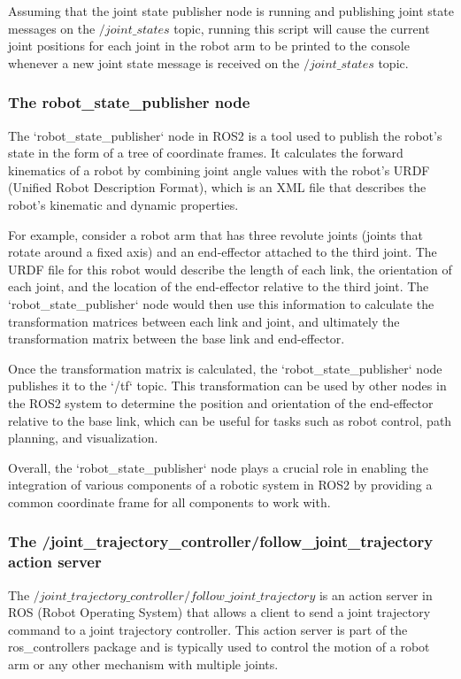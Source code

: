 \documentclass[12pt,oneside]{article}
\begin{document}
Assuming that the joint state publisher node is running and publishing joint state messages on the $/joint\_states$ topic, running this script will cause the current joint positions for each joint in the robot arm to be printed to the console whenever a new joint state message is received on the $/joint\_states$ topic.

\subsubsection{The robot\_state\_publisher node}\label{ros2-robot-state-publisher}
The `robot\_state\_publisher` node in ROS2 is a tool used to publish the robot's state in the form of a tree of coordinate frames. It calculates the forward kinematics of a robot by combining joint angle values with the robot's URDF (Unified Robot Description Format), which is an XML file that describes the robot's kinematic and dynamic properties. 

For example, consider a robot arm that has three revolute joints (joints that rotate around a fixed axis) and an end-effector attached to the third joint. The URDF file for this robot would describe the length of each link, the orientation of each joint, and the location of the end-effector relative to the third joint. The `robot\_state\_publisher` node would then use this information to calculate the transformation matrices between each link and joint, and ultimately the transformation matrix between the base link and end-effector.

Once the transformation matrix is calculated, the `robot\_state\_publisher` node publishes it to the `/tf` topic. This transformation can be used by other nodes in the ROS2 system to determine the position and orientation of the end-effector relative to the base link, which can be useful for tasks such as robot control, path planning, and visualization.

Overall, the `robot\_state\_publisher` node plays a crucial role in enabling the integration of various components of a robotic system in ROS2 by providing a common coordinate frame for all components to work with.

\subsubsection{The /joint\_trajectory\_controller/follow\_joint\_trajectory action server}\label{ros2-joint-trajectory-controller}
The $/joint\_trajectory\_controller/follow\_joint\_trajectory$ is an action server in ROS (Robot Operating System) that allows a client to send a joint trajectory command to a joint trajectory controller. This action server is part of the ros\_controllers package and is typically used to control the motion of a robot arm or any other mechanism with multiple joints.
\end{document}
